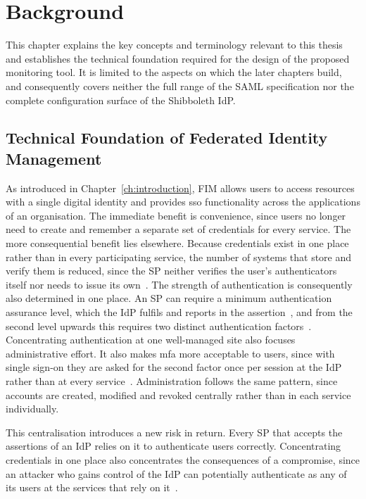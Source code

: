 \documentclass[../main.tex]{subfiles}
\begin{document}
\chapter{Background}\label{ch:background}

This chapter explains the key concepts and terminology relevant to this thesis and establishes 
the technical foundation required for the design of the proposed monitoring tool. 
It is limited to the aspects on which the later chapters build, and consequently covers neither 
the full range of the SAML specification nor the complete configuration surface of the 
Shibboleth IdP.

\section{Technical Foundation of Federated Identity Management}\label{sec:fim}

As introduced in Chapter~\ref{ch:introduction}, FIM allows users to access resources with a single 
digital identity and provides \gls{sso} functionality across the applications of an organisation. 
The immediate benefit is convenience, since users no longer need to create and remember a 
separate set of credentials for every service. 
The more consequential benefit lies elsewhere. 
Because credentials exist in one place rather than in every participating service, the number of 
systems that store and verify them is reduced, since the SP neither verifies the user's 
authenticators itself nor needs to issue its own~\cite{NIST80063C}. 
The strength of authentication is consequently also determined in one place. 
An SP can require a minimum authentication assurance level, which the IdP fulfils and reports in 
the assertion~\cite{NIST80063C}, and from the second level upwards this requires two distinct 
authentication factors~\cite{NIST80063B}. 
Concentrating authentication at one well-managed site also focuses administrative effort. 
It also makes \gls{mfa} more acceptable to users, since with single sign-on they 
are asked for the second factor once per session at the IdP rather than at every service~\cite{ShibbolethGIAC}. 
Administration follows the same pattern, since accounts are created, modified and revoked 
centrally rather than in each service individually.

This centralisation introduces a new risk in return. 
Every SP that accepts the assertions of an IdP relies on it to authenticate users correctly. 
Concentrating credentials in one place also concentrates the consequences of a compromise, since 
an attacker who gains control of the IdP can potentially authenticate as any of its users at the 
services that rely on it~\cite{IdPSinglePointOfTrust}. 
\end{document}
